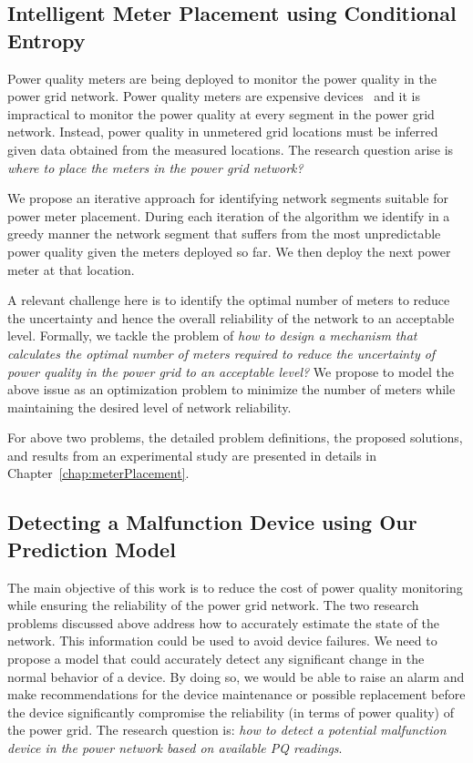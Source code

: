 \subsection{Intelligent Meter Placement using Conditional Entropy}
Power quality meters are being deployed to monitor the power quality in the power grid network. Power quality meters are expensive devices~\cite{fluke_meter, schneider_meter} and it is impractical to monitor the power quality at every segment in the power grid network. Instead, power quality in unmetered grid locations must be inferred given data obtained from the measured locations. The research question arise is \textit{where to place the meters in the power grid network?}
	
We propose an iterative approach for identifying network segments suitable for power meter placement. During each iteration of the algorithm we identify in a greedy manner the network segment that suffers from the most unpredictable power quality given the meters deployed so far. We then deploy the next power meter at that location.

A relevant challenge here is to identify the optimal number of meters to reduce the uncertainty and hence the overall reliability of the network to an acceptable level. Formally, we tackle the problem of \textit{how to design a mechanism that calculates the optimal number of meters required to reduce the uncertainty of power quality in the power grid to an acceptable level?} We propose to model the above issue as an optimization problem to minimize the number of meters while maintaining the desired level of network reliability.

For above two problems, the detailed problem definitions, the proposed solutions, and results from an experimental study are presented in details in Chapter~\ref{chap:meterPlacement}.

\subsection{Detecting a Malfunction Device using Our Prediction Model}
The main objective of this work is to reduce the cost of power quality monitoring while ensuring the reliability of the power grid network. The two research problems discussed above address how to accurately estimate the state of the network. This information could be used to avoid device failures. We need to propose a model that could accurately detect any significant change in the normal behavior of a device. By doing so, we would be able to raise an alarm and make recommendations for the device maintenance or possible replacement before the device significantly compromise the reliability (in terms of power quality) of the power grid. The research question is: \textit{how to detect a potential malfunction device in the power network based on available PQ readings}.

